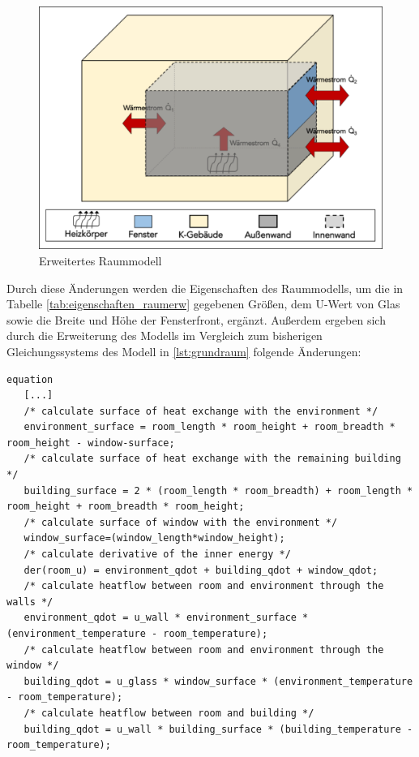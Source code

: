 \begin{figure}
\centering
\includegraphics[width=\textwidth]{abbildungen/20160316_raumeins}
\caption{Erweitertes Raummodell}
\label{fig:raumeins}
\end{figure}

Durch diese Änderungen werden die Eigenschaften des Raummodells, um die in Tabelle \ref{tab:eigenschaften_raumerw} gegebenen Größen, dem U-Wert von Glas sowie die Breite und Höhe der Fensterfront, ergänzt. Außerdem ergeben sich durch die Erweiterung des Modells im Vergleich zum bisherigen Gleichungssystems des Modell in \ref{lst:grundraum} folgende Änderungen:

\begin{lstlisting}[language=Modelica, caption={Erweitertes Gleichungssystem Modell des Raumes unter Berücksichtigung der räumlichen Gegebenheiten in Modelica},label=lst:raumeins]
equation
   [...]
   /* calculate surface of heat exchange with the environment */
   environment_surface = room_length * room_height + room_breadth * room_height - window-surface;
   /* calculate surface of heat exchange with the remaining building */
   building_surface = 2 * (room_length * room_breadth) + room_length * room_height + room_breadth * room_height;
   /* calculate surface of window with the environment */
   window_surface=(window_length*window_height);
   /* calculate derivative of the inner energy */
   der(room_u) = environment_qdot + building_qdot + window_qdot;
   /* calculate heatflow between room and environment through the walls */
   environment_qdot = u_wall * environment_surface * (environment_temperature - room_temperature);
   /* calculate heatflow between room and environment through the window */
   building_qdot = u_glass * window_surface * (environment_temperature - room_temperature);
   /* calculate heatflow between room and building */
   building_qdot = u_wall * building_surface * (building_temperature - room_temperature);
\end{lstlisting}


